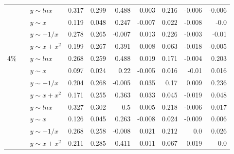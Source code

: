 \begin{table*}[!ht]
\begin{tabular}{| l | l | l | r | r | r | r | r | r | r | }
&\multirow{4}{*}{\metrictwop{}}
&$y\sim lnx$&\cellcolor[rgb]{.7,.7,.7}0.317&\cellcolor[rgb]{.7,.7,.7}0.299&\cellcolor[rgb]{.7,.7,.7}0.488&\cellcolor[rgb]{.9,.9,.9}0.003&\cellcolor[rgb]{.9,.9,.9}0.216&-0.006&-0.006  \\ \cline{3-10}
&&$y\sim x$&\cellcolor[rgb]{.9,.9,.9}0.119&\cellcolor[rgb]{.9,.9,.9}0.048&\cellcolor[rgb]{.9,.9,.9}0.247&-0.007&\cellcolor[rgb]{.9,.9,.9}0.022&-0.008&-0.0  \\ \cline{3-10}
&&$y\sim -1/x$&\cellcolor[rgb]{.7,.7,.7}0.278&\cellcolor[rgb]{.7,.7,.7}0.265&-0.007&\cellcolor[rgb]{.9,.9,.9}0.013&\cellcolor[rgb]{.9,.9,.9}0.226&-0.003&-0.01  \\ \cline{3-10}
&&$y\sim x+x^2$&\cellcolor[rgb]{.9,.9,.9}0.199&\cellcolor[rgb]{.7,.7,.7}0.267&\cellcolor[rgb]{.7,.7,.7}0.391&\cellcolor[rgb]{.9,.9,.9}0.008&\cellcolor[rgb]{.9,.9,.9}0.063&-0.018&-0.005  \\ \hline

\multirow{16}{*}{4\%}

&\multirow{4}{*}{\metricone{}}
&$y\sim lnx$&\cellcolor[rgb]{.7,.7,.7}0.268&\cellcolor[rgb]{.7,.7,.7}0.259&\cellcolor[rgb]{.7,.7,.7}0.488&\cellcolor[rgb]{.9,.9,.9}0.019&\cellcolor[rgb]{.9,.9,.9}0.171&-0.004&\cellcolor[rgb]{.9,.9,.9}0.203  \\ \cline{3-10}
&&$y\sim x$&\cellcolor[rgb]{.9,.9,.9}0.097&\cellcolor[rgb]{.9,.9,.9}0.024&\cellcolor[rgb]{.9,.9,.9}0.22&-0.005&\cellcolor[rgb]{.9,.9,.9}0.016&-0.01&\cellcolor[rgb]{.9,.9,.9}0.016  \\ \cline{3-10}
&&$y\sim -1/x$&\cellcolor[rgb]{.9,.9,.9}0.204&\cellcolor[rgb]{.7,.7,.7}0.268&-0.005&\cellcolor[rgb]{.9,.9,.9}0.035&\cellcolor[rgb]{.9,.9,.9}0.17&\cellcolor[rgb]{.9,.9,.9}0.009&\cellcolor[rgb]{.9,.9,.9}0.236  \\ \cline{3-10}
&&$y\sim x+x^2$&\cellcolor[rgb]{.9,.9,.9}0.171&\cellcolor[rgb]{.7,.7,.7}0.255&\cellcolor[rgb]{.7,.7,.7}0.363&\cellcolor[rgb]{.9,.9,.9}0.033&\cellcolor[rgb]{.9,.9,.9}0.045&-0.019&\cellcolor[rgb]{.9,.9,.9}0.048  \\ \cline{2-10}

&\multirow{4}{*}{\metrictwor{}}
&$y\sim lnx$&\cellcolor[rgb]{.7,.7,.7}0.327&\cellcolor[rgb]{.7,.7,.7}0.302&\cellcolor[rgb]{.5,.5,.5}0.5&\cellcolor[rgb]{.9,.9,.9}0.005&\cellcolor[rgb]{.9,.9,.9}0.218&-0.006&\cellcolor[rgb]{.9,.9,.9}0.017  \\ \cline{3-10}
&&$y\sim x$&\cellcolor[rgb]{.9,.9,.9}0.126&\cellcolor[rgb]{.9,.9,.9}0.045&\cellcolor[rgb]{.7,.7,.7}0.263&-0.008&\cellcolor[rgb]{.9,.9,.9}0.024&-0.009&\cellcolor[rgb]{.9,.9,.9}0.006  \\ \cline{3-10}
&&$y\sim -1/x$&\cellcolor[rgb]{.7,.7,.7}0.268&\cellcolor[rgb]{.7,.7,.7}0.258&-0.008&\cellcolor[rgb]{.9,.9,.9}0.021&\cellcolor[rgb]{.9,.9,.9}0.212&0.0&\cellcolor[rgb]{.9,.9,.9}0.026  \\ \cline{3-10}
&&$y\sim x+x^2$&\cellcolor[rgb]{.9,.9,.9}0.211&\cellcolor[rgb]{.7,.7,.7}0.285&\cellcolor[rgb]{.7,.7,.7}0.411&\cellcolor[rgb]{.9,.9,.9}0.011&\cellcolor[rgb]{.9,.9,.9}0.067&-0.019&0.0  \\ \cline{2-10}


\end{tabular}
\end{table*}
